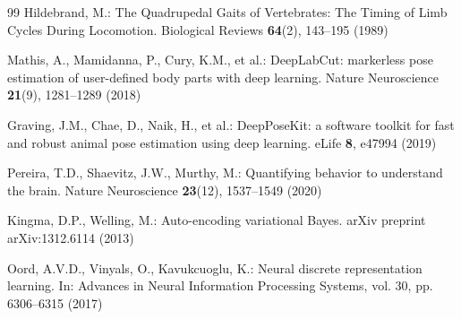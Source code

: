 \documentclass[runningheads]{llncs}
\begin{document}
\begin{thebibliography}{99}
Hildebrand, M.: The Quadrupedal Gaits of Vertebrates: The Timing of Limb Cycles During Locomotion. Biological Reviews \textbf{64}(2), 143--195 (1989)

Mathis, A., Mamidanna, P., Cury, K.M., et al.: DeepLabCut: markerless pose estimation of user-defined body parts with deep learning. Nature Neuroscience \textbf{21}(9), 1281--1289 (2018)

Graving, J.M., Chae, D., Naik, H., et al.: DeepPoseKit: a software toolkit for fast and robust animal pose estimation using deep learning. eLife \textbf{8}, e47994 (2019)

Pereira, T.D., Shaevitz, J.W., Murthy, M.: Quantifying behavior to understand the brain. Nature Neuroscience \textbf{23}(12), 1537--1549 (2020)

Kingma, D.P., Welling, M.: Auto-encoding variational Bayes. arXiv preprint arXiv:1312.6114 (2013)

Oord, A.V.D., Vinyals, O., Kavukcuoglu, K.: Neural discrete representation learning. In: Advances in Neural Information Processing Systems, vol. 30, pp. 6306--6315 (2017)

\end{thebibliography}
\end{document}
